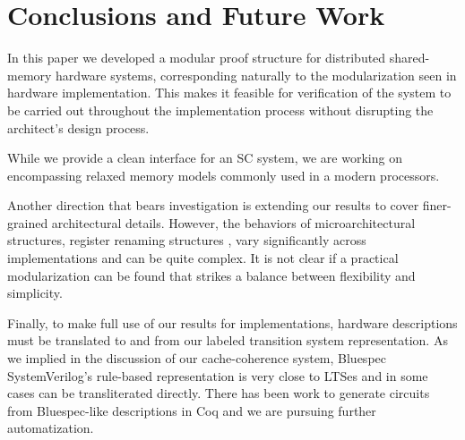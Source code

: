 \section{Conclusions and Future Work}\label{sec:conclusion}

In this paper we developed a modular proof structure for distributed
shared-memory hardware systems, corresponding naturally to the modularization seen in
hardware implementation. This makes it feasible for verification of the
system to be carried out throughout the implementation process without
disrupting the architect's design process.

While we provide a clean interface for an SC system, we are working on
encompassing relaxed memory models commonly used in a modern processors.

Another direction that bears investigation is extending our results to
cover finer-grained architectural details.
However, the behaviors of microarchitectural structures,
\ie{} register renaming structures \etc{}, vary significantly across
implementations and can be quite complex. It is not clear if a
practical modularization can be found that strikes a balance between flexibility and
simplicity.

Finally, to make full use of our results for implementations, hardware
descriptions must be translated to and from our labeled transition system
representation. As we implied in the discussion of our cache-coherence system,
Bluespec SystemVerilog's rule-based representation is very close to LTSes and
in some cases can be transliterated directly.  There has been work to generate
circuits from Bluespec-like descriptions in Coq \cite{Braibant2013Fesi} and we
are pursuing further automatization.
